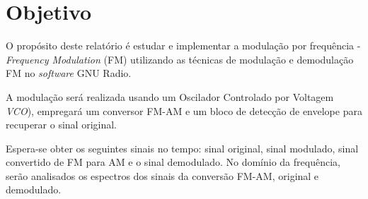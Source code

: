 \section{Objetivo}
O propósito deste relatório é estudar e implementar a modulação por frequência - \textit{Frequency Modulation} (FM) utilizando as técnicas de modulação e demodulação FM no \textit{software} GNU Radio.
\par
A modulação será realizada usando um Oscilador Controlado por Voltagem \textit{VCO}), empregará um conversor FM-AM e um bloco de detecção de envelope para recuperar o sinal original.
\par
Espera-se obter os seguintes sinais no tempo: sinal original, sinal modulado, sinal convertido de FM para AM e o sinal demodulado. No domínio da frequência, serão analisados os espectros dos sinais da conversão FM-AM, original e demodulado.